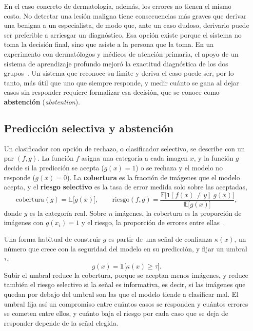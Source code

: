 En el caso concreto de dermatología, además, los errores no tienen el mismo costo. No detectar una lesión
maligna tiene consecuencias más graves que derivar una benigna a un especialista, de modo que, ante un caso
dudoso, derivarlo puede ser preferible a arriesgar un diagnóstico. Esa opción existe porque el sistema no toma la
decisión final, sino que asiste a la persona que la toma. En un experimento con dermatólogos y médicos de
atención primaria, el apoyo de un sistema de aprendizaje profundo mejoró la exactitud diagnóstica de los dos
grupos~\cite{groh2024learningaided}. Un sistema que reconoce su límite y deriva el caso puede ser, por lo tanto,
más útil que uno que siempre responde, y medir cuánto se gana al dejar casos sin responder requiere formalizar
esa decisión, que se conoce como \textbf{abstención} (\emph{abstention}).

\subsection{Predicción selectiva y abstención}
\label{sec:marco_pred_selectiva}

Un clasificador con opción de rechazo, o clasificador selectivo, se describe con un par $(f, g)$. La función $f$
asigna una categoría a cada imagen $x$, y la función $g$ decide si la predicción se acepta ($g(x) = 1$) o se
rechaza y el modelo no responde ($g(x) = 0$). La \textbf{cobertura} es la fracción de imágenes que el modelo acepta, y el
\textbf{riesgo selectivo} es la tasa de error medida solo sobre las aceptadas,
\begin{equation}
    \mathrm{cobertura}(g) = \mathbb{E}\bigl[g(x)\bigr], \qquad
    \mathrm{riesgo}(f, g) = \frac{\mathbb{E}\bigl[\mathbf{1}[f(x) \neq y]\; g(x)\bigr]}{\mathbb{E}\bigl[g(x)\bigr]},
    \label{eq:marco_riesgo_selectivo}
\end{equation}
donde $y$ es la categoría real. Sobre $n$ imágenes, la cobertura es la proporción de imágenes con
$g(x_i) = 1$ y el riesgo, la proporción de errores entre ellas~\cite{elyaniv2010foundations,geifman2017selective}.

Una forma habitual de construir $g$ es partir de una señal de confianza $\kappa(x)$, un número que crece con la
seguridad del modelo en su predicción, y fijar un umbral $\tau$,
\begin{equation}
    g(x) = \mathbf{1}\bigl[\kappa(x) \ge \tau\bigr].
    \label{eq:marco_umbral_confianza}
\end{equation}
Subir el umbral reduce la cobertura, porque se aceptan menos imágenes, y reduce también el riesgo selectivo si
la señal es informativa, es decir, si las imágenes que quedan por debajo del umbral son las que el modelo tiende
a clasificar mal. El umbral fija así un compromiso entre cuántos casos se responden y cuántos errores se cometen
entre ellos, y cuánto baja el riesgo por cada caso que se deja de responder depende de la señal elegida.

